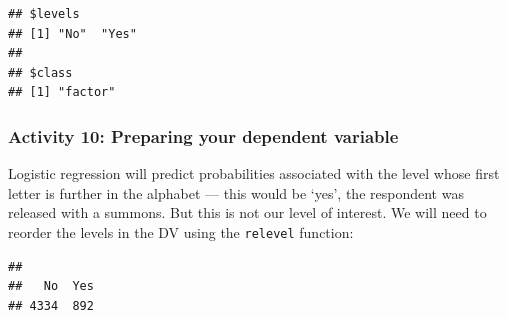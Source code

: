 \documentclass[
]{book}
\newenvironment{Shaded}{\begin{snugshade}}{\end{snugshade}}
\newcommand{\AttributeTok}[1]{\textcolor[rgb]{0.77,0.63,0.00}{#1}}
\newcommand{\CommentTok}[1]{\textcolor[rgb]{0.56,0.35,0.01}{\textit{#1}}}
\newcommand{\ConstantTok}[1]{\textcolor[rgb]{0.00,0.00,0.00}{#1}}
\newcommand{\FunctionTok}[1]{\textcolor[rgb]{0.00,0.00,0.00}{#1}}
\newcommand{\NormalTok}[1]{#1}
\newcommand{\OtherTok}[1]{\textcolor[rgb]{0.56,0.35,0.01}{#1}}
\newcommand{\SpecialCharTok}[1]{\textcolor[rgb]{0.00,0.00,0.00}{#1}}
\newcommand{\StringTok}[1]{\textcolor[rgb]{0.31,0.60,0.02}{#1}}
\begin{document}
\begin{verbatim}
## $levels
## [1] "No"  "Yes"
## 
## $class
## [1] "factor"
\end{verbatim}

\hypertarget{activity-10-preparing-your-dependent-variable}{%
\subsubsection{Activity 10: Preparing your dependent variable}\label{activity-10-preparing-your-dependent-variable}}

Logistic regression will predict probabilities associated with the level whose first letter is further in the alphabet --- this would be `yes', the respondent was released with a summons. But this is not our level of interest. We will need to reorder the levels in the DV using the \texttt{relevel} function:

\begin{Shaded}
\end{Shaded}

\begin{verbatim}
## 
##   No  Yes 
## 4334  892
\end{verbatim}

\begin{Shaded}
\end{Shaded}
\end{document}
